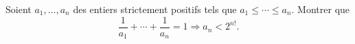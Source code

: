 Soient $a_1, \ldots, a_n$ des entiers strictement positifs tels que $a_1 \leq \cdots \leq a_n$. Montrer que
\[ \frac{1}{a_1} + \cdots + \frac{1}{a_n} = 1 \Rightarrow a_n < 2^{n!}. \]

